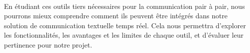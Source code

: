 \paragraph{}
En étudiant ces outils tiers nécessaires pour la communication pair à pair, nous pourrons mieux comprendre comment ils peuvent être intégrés dans notre solution de communication textuelle temps réel. Cela nous permettra d'explorer les fonctionnalités, 
les avantages et les limites de chaque outil, et d'évaluer leur pertinence pour notre projet.



